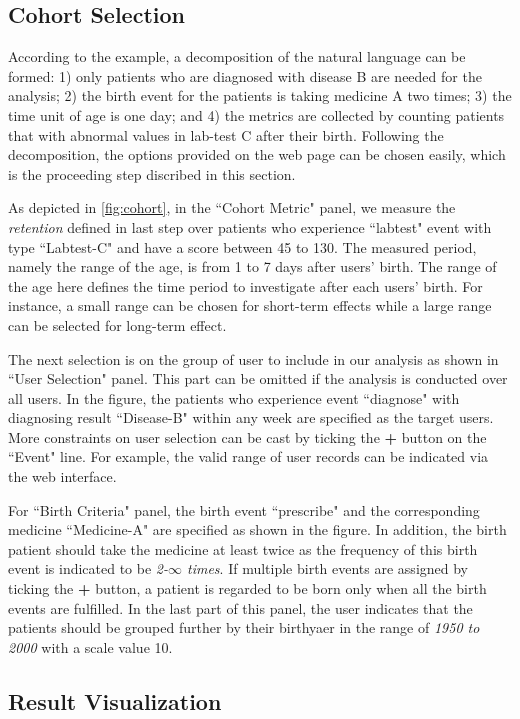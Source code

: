 \documentclass[10pt,conference,letterpaper]{IEEEtran}
\begin{document}
\subsection{Cohort Selection}

According to the example, a decomposition of the natural language can be formed: 1) only patients who are diagnosed with disease B are needed for the analysis; 2) the birth event for the patients is taking medicine A two times; 3) the time unit of age is one day; and 4) the metrics are collected by counting patients that with abnormal values in lab-test C after their birth. 
Following the decomposition, the options provided on the web page can be chosen easily, which is the proceeding step discribed in this section.

As depicted in \ref{fig:cohort}, in the ``Cohort Metric" panel, we measure the \emph{retention} defined in last step over patients who experience ``labtest" event with type ``Labtest-C" and have a score between 45 to 130. 
The measured period, namely the range of the age, is from 1 to 7 days after users' birth.
The range of the age here defines the time period to investigate after each users' birth. For instance, a small range can be chosen for short-term effects while a large range can be selected for long-term effect.

The next selection is on the group of user to include in our analysis as shown in ``User Selection" panel. This part can be omitted if the analysis is conducted over all users. 
In the figure, the patients who experience event ``diagnose" with diagnosing result ``Disease-B" within any week are specified as the target users.
More constraints on user selection can be cast by ticking the \textbf{+} button on the ``Event" line.
For example, the valid range of user records can be indicated via the web interface.

For ``Birth Criteria" panel, the birth event ``prescribe" and the corresponding medicine ``Medicine-A" are specified as shown in the figure.
In addition, the birth patient should take the medicine at least twice as the frequency of this birth event is indicated to be \emph{2-$\infty$ times}.
If multiple birth events are assigned by ticking the \textbf{+} button, a patient is regarded to be born only when all the birth events are fulfilled. 
In the last part of this panel, the user indicates that the patients should be grouped further by their birthyaer in the range of \emph{1950 to 2000} with a scale value 10.

\subsection{Result Visualization}
\end{document}
